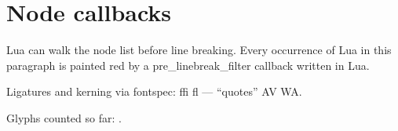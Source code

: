 \documentclass{article}
\begin{document}
\section*{Node callbacks}

Lua can walk the node list before line breaking. Every occurrence of
Lua in this paragraph is painted red by a pre\_linebreak\_filter
callback written in Lua.

Ligatures and kerning via fontspec: ffi fl --- ``quotes'' AV WA.

\bigskip
Glyphs counted so far: .
\end{document}
